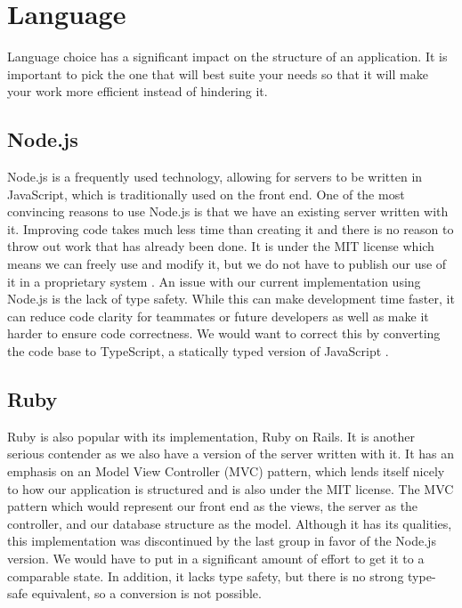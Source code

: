 
\section{Language}
    Language choice has a significant impact on the structure of an application. It is important to pick the one that will best suite your needs so that it will make your work more efficient instead of hindering it.
    \subsection{Node.js}
        Node.js \cite{nodejs} is a frequently used technology, allowing for servers to be written in JavaScript, which is traditionally used on the front end.
            One of the most convincing reasons to use Node.js is that we have an existing server written with it. Improving code takes much less time than creating it and there is no reason to throw out work that has already been done. It is under the MIT license which means we can freely use and modify it, but we do not have to publish our use of it in a proprietary system \cite{mit}. An issue with our current implementation using Node.js is the lack of type safety. While this can make development time faster, it can reduce code clarity for teammates or future developers as well as make it harder to ensure code correctness. We would want to correct this by converting the code base to TypeScript, a statically typed version of JavaScript \cite{tsvsjs}.
    \subsection{Ruby}
        Ruby is also popular with its implementation, Ruby on Rails. It is another serious contender as we also have a version of the server written with it. It has an emphasis on an Model View Controller (MVC) pattern, which lends itself nicely to how our application is structured and is also under the MIT license. The MVC pattern which would represent our front end as the views, the server as the controller, and our database structure as the model. Although it has its qualities, this implementation was discontinued by the last group in favor of the Node.js version. We would have to put in a significant amount of effort to get it to a comparable state. In addition, it lacks type safety, but there is no strong type-safe equivalent, so a conversion is not possible.
